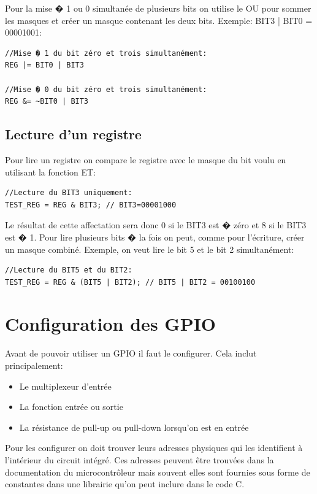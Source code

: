 Pour la mise � 1 ou 0 simultanée de plusieurs bits on utilise le OU pour sommer les masques et créer un masque contenant les deux bits. Exemple: BIT3 | BIT0 = 00001001:

\lstset{style=customc}
\begin{lstlisting}
//Mise � 1 du bit zéro et trois simultanément:
REG |= BIT0 | BIT3

//Mise � 0 du bit zéro et trois simultanément:
REG &= ~BIT0 | BIT3
\end{lstlisting}

\subsection{Lecture d'un registre}

Pour lire un registre on compare le registre avec le masque du bit voulu en utilisant la fonction ET: 

\lstset{style=customc}
\begin{lstlisting}
//Lecture du BIT3 uniquement:
TEST_REG = REG & BIT3; // BIT3=00001000
\end{lstlisting}

Le résultat de cette affectation sera donc 0 si le BIT3 est � zéro et 8 si le BIT3 est � 1. Pour lire plusieurs bits � la fois on peut, comme pour l'écriture, créer un masque combiné. Exemple, on veut lire le bit 5 et le bit 2 simultanément:

\lstset{style=customc}
\begin{lstlisting}
//Lecture du BIT5 et du BIT2:
TEST_REG = REG & (BIT5 | BIT2); // BIT5 | BIT2 = 00100100
\end{lstlisting}

\section{Configuration des GPIO}

Avant de pouvoir utiliser un GPIO il faut le configurer. Cela inclut principalement:

\begin{itemize}[label=\textbullet,font=\small]
\item Le multiplexeur d'entrée
\item La fonction entrée ou sortie
\item La résistance de pull-up ou pull-down lorsqu'on est en entrée
\end{itemize}

Pour les configurer on doit trouver leurs adresses physiques qui les identifient à l'intérieur du circuit intégré. Ces adresses peuvent être trouvées dans la documentation du microcontrôleur mais souvent elles sont fournies sous forme de constantes dans une librairie qu'on peut inclure dans le code C.


